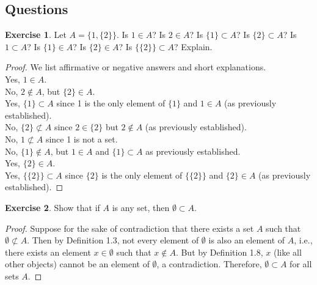 \documentclass[titlepage]{article}
\newcounter{script}
\theoremstyle{definition}
\newtheorem{exercise}{Exercise}[script]
\begin{document}
\subsection{Questions}
\setcounter{exercise}{3}
\begin{exercise}
    Let $A=\{1,\{2\}\}$. Is $1\in A$? Is $2\in A$? Is $\{1\}\subset A$? Is $\{2\}\subset A$? Is $1\subset A$? Is $\{1\}\in A$? Is $\{2\}\in A$? Is $\{\{2\}\}\subset A$? Explain.
    \begin{proof}
        We list affirmative or negative answers and short explanations.\\[3pt]
        Yes, $1\in A$.\\
        No, $2\notin A$, but $\{2\}\in A$.\\
        Yes, $\{1\}\subset A$ since 1 is the only element of $\{1\}$ and $1\in A$ (as previously established).\\
        No, $\{2\}\not\subset A$ since $2\in\{2\}$ but $2\notin A$ (as previously established).\\
        No, $1\not\subset A$ since 1 is not a set.\\
        No, $\{1\}\notin A$, but $1\in A$ and $\{1\}\subset A$ as previously established.\\
        Yes, $\{2\}\in A$.\\
        Yes, $\{\{2\}\}\subset A$ since $\{2\}$ is the only element of $\{\{2\}\}$ and $\{2\}\in A$ (as previously established).
    \end{proof}
\end{exercise}

\setcounter{exercise}{9}

\begin{exercise}
    Show that if $A$ is any set, then $\emptyset\subset A$.
    \begin{proof}
        Suppose for the sake of contradiction that there exists a set $A$ such that $\emptyset\not\subset A$. Then by Definition 1.3, not every element of $\emptyset$ is also an element of $A$, i.e., there exists an element $x\in\emptyset$ such that $x\notin A$. But by Definition 1.8, $x$ (like all other objects) cannot be an element of $\emptyset$, a contradiction. Therefore, $\emptyset\subset A$ for all sets $A$.
    \end{proof}
\end{exercise}

\setcounter{exercise}{20}
\end{document}
